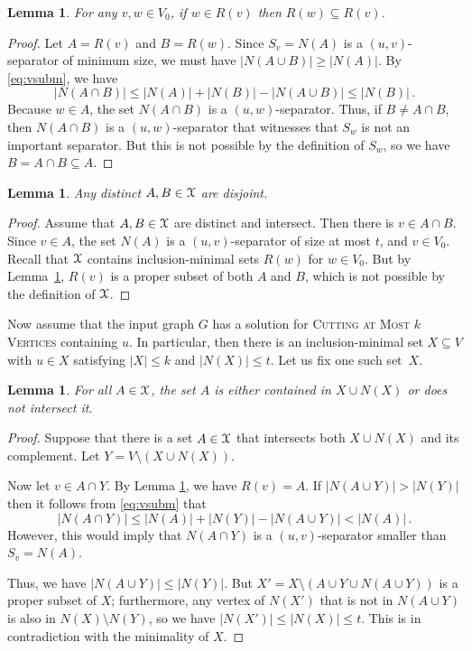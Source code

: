 \documentclass[a4paper,11pt]{article}
\newtheorem{lemma}[theorem]{Lemma}
\theoremstyle{definition}
\theoremstyle{remark}
\newcommand{\X}{\EuScript{X}}
\newcommand{\card}[1]{\left\lvert {#1} \right\rvert}
\newcommand{\vbound}[1]{\card{N(#1)}}
\begin{document}
\begin{lemma}\label{lemma:R_containment}
For any $v, w \in V_0$, if $w \in R(v)$ then $R(w) \subseteq R(v)$.
\end{lemma}

\begin{proof}
Let $A = R(v)$ and $B = R(w)$. Since $S_v = N(A)$ is a $(u,v)$-separator of minimum size, we must have $\vbound{A \cup B} \ge \vbound{A}$. By \eqref{eq:vsubm}, we have
\[ \vbound{A \cap B} \le \vbound{A} + \vbound{B} - \vbound{A \cup B} \le \vbound{B}\,.\]
Because $w \in A$, the set $N(A \cap B)$ is a $(u,w)$-separator.
Thus, if $B \not= A \cap B $, then $N(A \cap B)$ is a $(u,w)$-separator that witnesses that $S_w$ is not an important separator. But this is not possible by the definition of $S_w$, so we have $B = A \cap B \subseteq A$.
\end{proof}

\begin{lemma}\label{lemma:R_disjoint}
Any distinct $A, B \in \X$ are disjoint.
\end{lemma}

\begin{proof}
Assume that $A, B \in \X$ are distinct and intersect. Then there is $v \in A \cap B$.
Since $v\in A$, the set $N(A)$ is a $(u,v)$-separator of size at most $t$, and $v\in V_0$.
Recall that $\X$ contains inclusion-minimal sets $R(w)$ for $w\in V_0$. 
But by Lemma~\ref{lemma:R_containment},  $R(v)$ is a proper subset of both $A$ and $B$, which is not possible by the definition of $\X$.
\end{proof}

Now assume that the input graph $G$ has a solution for \textsc{Cutting at Most  $k$ Vertices} containing $u$. In particular, then there is an inclusion-minimal set $X \subseteq V$ with $u \in X$ satisfying $\card{X} \le k$ and $\vbound{X} \le t$. Let us fix one such set~$X$.

\begin{lemma}\label{lemma:R_intersects_U}
For all $A \in \X$, the set $A$ is either contained in $X \cup N(X)$ or does not intersect it.
\end{lemma}

\begin{proof}
Suppose that there is a set $A \in \X$ that intersects both $X \cup N(X)$ and its complement. Let $Y = V \setminus (X \cup N(X))$.

Now let $v \in A \cap Y$. By Lemma \ref{lemma:R_containment}, we have $R(v) = A$. 
If $\vbound{A \cup Y} > \vbound{Y}$ then it follows from \eqref{eq:vsubm} that
\[ \vbound{A \cap Y} \le \vbound{A} + \vbound{Y} - \vbound{A \cup Y} < \vbound{A}\,.\]
However, this would imply that $N(A \cap Y)$ is a $(u,v)$-separator smaller than $S_v = N(A)$.

Thus, we have $\vbound{A \cup Y} \le \vbound{Y}$. But $X' = X \setminus (A \cup Y \cup N(A \cup Y))$ is a proper subset of $X$; furthermore, any vertex of $N(X')$ that is not in $N(A \cup Y)$ is also in $N(X) \setminus N(Y)$, so we have $\vbound{X'} \le \vbound{X} \le t$. This is in contradiction with the minimality of $X$.
\end{proof}
\end{document}
